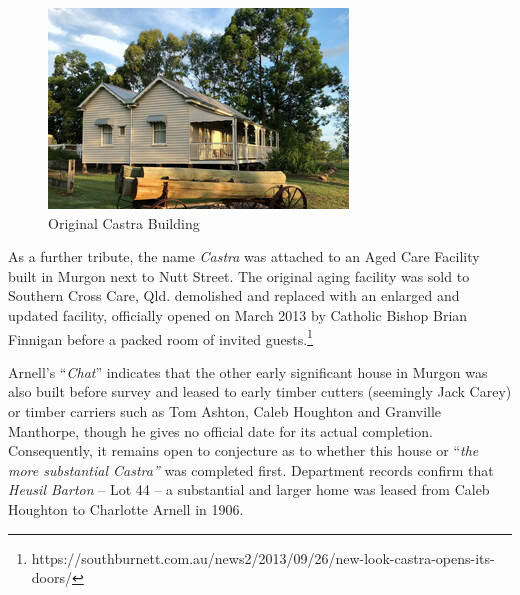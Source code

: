\begin{figure}
\begin{center}
\includegraphics[width=1.\linewidth,center]{../images/castraOld.png}
\caption{Original Castra Building}
\end{center}
\end{figure}




As a further tribute, the name \emph{Castra} was attached to an Aged Care Facility built in Murgon next to Nutt Street. The original aging facility was sold to Southern Cross Care, Qld. demolished and replaced with an enlarged and updated facility, officially opened on March 2013 by Catholic Bishop Brian Finnigan before a packed room of invited guests.\footnote{https://southburnett.com.au/news2/2013/09/26/new-look-castra-opens-its-doors/}


Arnell's ``\emph{Chat}'' indicates that the other early significant house in Murgon was also built before survey and leased to early timber cutters (seemingly Jack Carey) or timber carriers such as Tom Ashton, Caleb Houghton and Granville Manthorpe, though he gives no official date for its actual completion. Consequently, it remains open to conjecture as to whether this house or ``\emph{the more substantial Castra''} was completed first. Department records confirm that \emph{Heusil Barton} -- Lot 44 -- a substantial and larger home was leased from Caleb Houghton to Charlotte Arnell in 1906.



